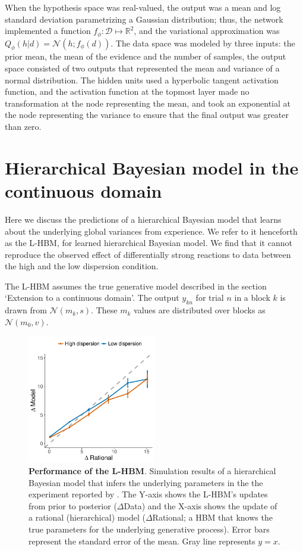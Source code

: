 When the hypothesis space was real-valued, the output was a mean and log standard deviation parametrizing a Gaussian distribution; thus, the network implemented a function $f_\phi: \mathcal{D} \mapsto \mathbb{R}^2$, and the variational approximation was $Q_\phi(h|d) = \mathcal{N}(h; f_\phi(d))$. The data space was modeled by three inputs: the prior mean, the mean of the evidence and the number of samples, the output space consisted of two outputs that represented the mean and variance of a normal distribution. The hidden units used a hyperbolic tangent activation function, and the activation function at the topmost layer made no transformation at the node representing the mean, and took an exponential at the node representing the variance to ensure that the final output was greater than zero.

\newpage 


\section{Hierarchical Bayesian model in the continuous domain}
\label{app:LTI_HBM}

Here we discuss the predictions of a hierarchical Bayesian model that learns about the underlying global variances from experience. We refer to it henceforth as the L-HBM, for learned hierarchical Bayesian model. We find that it cannot reproduce the observed effect of differentially strong reactions to data between the high and the low dispersion condition. 

The L-HBM assumes the true generative model described in the section `Extension to a continuous domain'. The output $y_{kn}$ for trial $n$ in a block $k$ is drawn from $\mathcal{N}(m_k,s)$. These $m_k$ values are distributed over blocks as $\mathcal{N}(m_0,v)$.


\begin{figure}[hb!]
\centering
    \includegraphics[width=0.5\textwidth]{figures/samstan.pdf}
  \caption{\textbf{Performance of the L-HBM}. Simulation results of a hierarchical Bayesian model that infers the underlying parameters in the the experiment reported by \cite{gershman2017blessing}. The Y-axis shows the L-HBM's updates from prior to posterior ($\Delta$Data) and the X-axis shows the update of a rational (hierarchical) model ($\Delta$Rational; a HBM that knows the true parameters for the underlying generative process). Error bars represent the standard error of the mean. Gray line represents $y=x$.} 
  \label{fig:App:hierBayes}
\end{figure}


